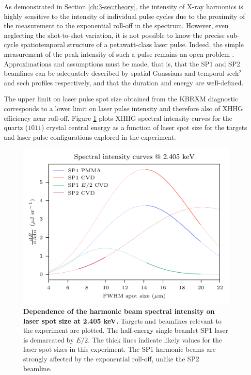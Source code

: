 As demonstrated in Section \ref{ch:3-sec:theory}, the intensity of X-ray harmonics is highly sensitive to the intensity of individual pulse cycles due to the proximity of the measurement to the exponential roll-off in the spectrum. However, even neglecting the shot-to-shot variation, it is not possible to know the precise sub-cycle spatiotemporal structure of a petawatt-class laser pulse. Indeed, the simple measurement of the peak intensity of such a pulse remains an open problem \cite{perevalovLaserPeelerRegime2023,ouatuIonizationStatesMultipetawatt2022}. Approximations and assumptions must be made, that is, that the SP1 and SP2 beamlines can be adequately described by spatial Gaussians and temporal sech$^2$ and sech profiles respectively, and that the duration and energy are well-defined. 

The upper limit on laser pulse spot size obtained from the KBRXM diagnostic corresponds to a lower limit on laser pulse intensity and therefore also of XHHG efficiency near roll-off. Figure \ref{fig:orionintensitycurves} plots XHHG spectral intensity curves for the quartz ($10\bar{1}1$) crystal central energy as a function of laser spot size for the targets and laser pulse configurations explored in the experiment. 
\begin{figure}
	\centering
	\includegraphics{figures/orion/orion_intensity_curves}
	\caption[Dependence of the harmonic beam spectral intensity on laser spot size at 2.405 keV.]{\textbf{Dependence of the harmonic beam spectral intensity on laser spot size at 2.405 keV.} Targets and beamlines relevant to the experiment are plotted. The half-energy single beamlet SP1 laser is demarcated by $E/2$. The thick lines indicate likely values for the laser spot sizes in this experiment. The SP1 harmonic beams are strongly affected by the exponential roll-off, unlike the SP2 beamline.}
	\label{fig:orionintensitycurves}
\end{figure}

